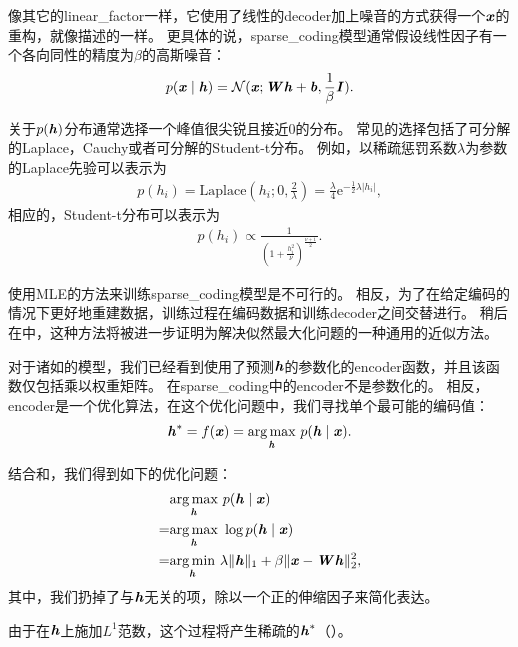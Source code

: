 像其它的\gls{linear_factor}一样，它使用了线性的\gls{decoder}加上噪音的方式获得一个$\boldsymbol{\mathit{x}}$的重构，就像描述的一样。
更具体的说，\gls{sparse_coding}模型通常假设线性因子有一个各向同性的精度为$\beta$的高斯噪音：
\begin{align}
\label{eqn:1312}
p(\boldsymbol{\mathit{x}}\mid \boldsymbol{\mathit{h}}) = \mathcal{N}
(\boldsymbol{\mathit{x}};\boldsymbol{\mathit{W}}\boldsymbol{\mathit{h}} + \boldsymbol{\mathit{b}} ,\frac{1}{\beta}\boldsymbol{\mathit{I}}).
\end{align}


关于$p(\boldsymbol{\mathit{h}})$分布通常选择一个峰值很尖锐且接近$0$的分布\citep{Olshausen+Field-1996}。
常见的选择包括了可分解的Laplace，Cauchy或者可分解的Student-t分布。
例如，以稀疏惩罚系数$\lambda$为参数的Laplace先验可以表示为
\begin{align}
\label{eqn:1313}
p(h_i) = \text{Laplace}(h_i;0,\frac{2}{\lambda}) = \frac{\lambda}{4} \text{e}^{ -\frac{1}{2}\lambda \vert h_i\vert},
\end{align}
相应的，Student-t分布可以表示为
\begin{align}
\label{eqn:1314}
p(h_i)\propto \frac{1}{(1+\frac{h_i^2}{\nu})^{\frac{\nu+1}{2}}}.
\end{align}

使用\gls{MLE}的方法来训练\gls{sparse_coding}模型是不可行的。
相反，为了在给定编码的情况下更好地重建数据，训练过程在编码数据和训练\gls{decoder}之间交替进行。
稍后在中，这种方法将被进一步证明为解决似然最大化问题的一种通用的近似方法。

对于诸如的模型，我们已经看到使用了预测$\boldsymbol{\mathit{h}}$的参数化的\gls{encoder}函数，并且该函数仅包括乘以权重矩阵。
在\gls{sparse_coding}中的\gls{encoder}不是参数化的。
相反，\gls{encoder}是一个优化算法，在这个优化问题中，我们寻找单个最可能的编码值：
\begin{align}
\label{eqn:1315}
\boldsymbol{\mathit{h}}^* = f(\boldsymbol{\mathit{x}}) = \underset{\boldsymbol{\mathit{h}}}{\arg\max}\  p(\boldsymbol{\mathit{h}}\mid\boldsymbol{\mathit{x}}).
\end{align}


结合和，我们得到如下的优化问题：
\begin{align}
\label{eqn:1316}
& \underset{\boldsymbol{\mathit{h}}}{\arg\max}\  p(\boldsymbol{\mathit{h}}\mid\boldsymbol{\mathit{x}}) \\
= & \underset{\boldsymbol{\mathit{h}}}{\arg\max}\ \log  p(\boldsymbol{\mathit{h}}\mid\boldsymbol{\mathit{x}})\\
= & \underset{\boldsymbol{\mathit{h}}}{\arg\min}\ \lambda \Vert \boldsymbol{\mathit{h}}\Vert_1 + \beta  \Vert \boldsymbol{\mathit{x}} - \boldsymbol{\mathit{W}} \boldsymbol{\mathit{h}}\Vert_2^2,
\end{align}
其中，我们扔掉了与$\boldsymbol{\mathit{h}}$无关的项，除以一个正的伸缩因子来简化表达。

由于在$\boldsymbol{\mathit{h}}$上施加$L^1$范数，这个过程将产生稀疏的$\boldsymbol{\mathit{h}}^*$（）。

